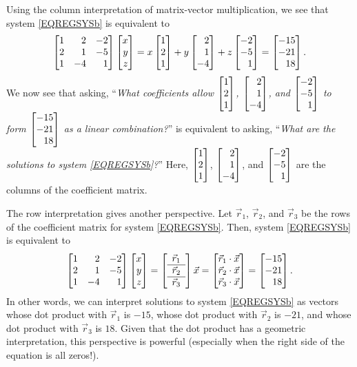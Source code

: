 Using the column interpretation of matrix-vector multiplication, we see that system \eqref{EQREGSYSb} is equivalent to
\[
	\mat{1&2&-2\\2&1&-5\\1&-4&1}\mat{x\\y\\z}=
	     x\mat{1\\2\\1}+y\mat{2\\1\\-4}+z\mat{-2\\-5\\1}
	     =\mat{-15\\-21\\18}.
\]
We now see that asking, ``\emph{What coefficients
allow $\mat{1\\2\\1}$, $\mat{2\\1\\-4}$, and $\mat{-2\\-5\\1}$ to form $\mat{-15\\-21\\18}$ as a linear combination?}'' is
equivalent to asking, ``\emph{What are the solutions to system \eqref{EQREGSYSb}?}''
Here,
 $\mat{1\\2\\1}$, $\mat{2\\1\\-4}$, and $\mat{-2\\-5\\1}$ are the columns of the coefficient matrix.


The row interpretation gives another perspective. Let $\vec r_1$, $\vec r_2$, and $\vec r_3$ be the rows of the coefficient matrix
for system \eqref{EQREGSYSb}. Then, system \eqref{EQREGSYSb} is equivalent to
\[
	\mat{1&2&-2\\2&1&-5\\1&-4&1}\mat{x\\y\\z}=
	\left[\begin{array}{c}\vec r_1\\\hline\vec r_2\\\hline\vec r_3\end{array}\right]\vec x=
	\mat{\vec r_1\cdot \vec x\\\vec r_2\cdot\vec x\\\vec r_3\cdot \vec x}
	     =\mat{-15\\-21\\18}.
\]
In other words, we can interpret solutions to system \eqref{EQREGSYSb} as vectors whose dot product
with $\vec r_1$ is $-15$, whose dot product with $\vec r_2$ is $-21$, and whose dot product with
$\vec r_3$ is $18$. Given that the dot product has a geometric interpretation, this perspective is powerful
(especially when the right side of the equation is all zeros!).

